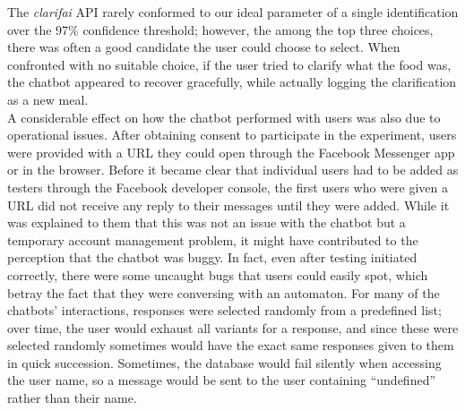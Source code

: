 The \textit{clarifai} API rarely conformed to our ideal parameter of a single identification over the 97\% confidence threshold; however, the among the top three choices, there was often a good candidate the user could choose to select. When confronted with no suitable choice, if the user tried to clarify what the food was, the chatbot appeared to recover gracefully, while actually logging the clarification as a new meal. \\
A considerable effect on how the chatbot performed with users was also due to operational issues. After obtaining consent to participate in the experiment, users were provided with a URL they could open through the Facebook Messenger app or in the browser. Before it became clear that individual users had to be added as testers through the Facebook developer console, the first users who were given a URL did not receive any reply to their messages until they were added. While it was explained to them that this was not an issue with the chatbot but a temporary account management problem, it might have contributed to the perception that the chatbot was buggy. In fact, even after testing initiated correctly, there were some uncaught bugs that users could easily spot, which betray the fact that they were conversing with an automaton. For many of the chatbots' interactions, responses were selected randomly from a predefined list; over time, the user would exhaust all variants for a response, and since these were selected randomly sometimes would have the exact same responses given to them in quick succession. Sometimes, the database would fail silently when accessing the user name, so a message would be sent to the user containing ``undefined'' rather than their name. \\

